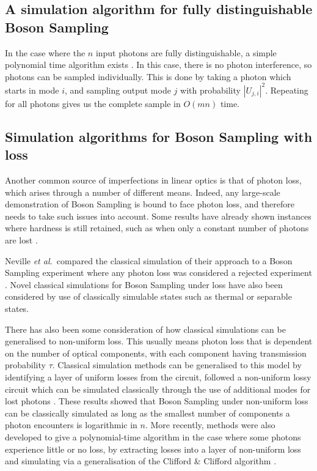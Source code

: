 \subsection{A simulation algorithm for fully distinguishable Boson Sampling}
\label{ssec:fully-dist-sim}

In the case where the $n$ input photons are fully distinguishable, a simple polynomial time algorithm exists \cite{aaronson2014}. In this case, there is no photon interference, so photons can be sampled individually. This is done by taking a photon which starts in mode $i$, and sampling output mode $j$ with probability $|U_{j,i}|^2$. Repeating for all photons gives us the complete sample in $O(mn)$ time.

\subsection{Simulation algorithms for Boson Sampling with loss}

Another common source of imperfections in linear optics is that of photon loss, which arises through a number of different means. 
Indeed, any large-scale demonstration of Boson Sampling is bound to face photon loss, and therefore needs to take such issues into account. 
Some results have already shown instances where hardness is still retained, such as when only a constant number of photons are lost \cite{aaronson2016,wang2018}.

Neville \textit{et al.}\ compared the classical simulation of their approach to a Boson Sampling experiment where any photon loss was considered a rejected experiment \cite{neville2017}. Novel classical simulations for Boson Sampling under loss have also been considered by use of classically simulable states such as thermal \cite{garciapatron2017} or separable \cite{oszmaniec2018} states.

There has also been some consideration of how classical simulations can be generalised to non-uniform loss. 
This usually means photon loss that is dependent on the number of optical components, with each component having transmission probability $\tau$. 
Classical simulation methods can be generalised to this model by identifying a layer of uniform losses from the circuit, followed a non-uniform lossy circuit which can be simulated classically through the use of additional modes for lost photons \cite{garciapatron2017,oszmaniec2018}. 
These results showed that Boson Sampling under non-uniform loss can be classically simulated as long as the smallest number of components a photon encounters is logarithmic in $n$. More recently, methods were also developed to give a polynomial-time algorithm in the case where some photons experience little or no loss, by extracting losses into a layer of non-uniform loss and simulating via a generalisation of the Clifford \& Clifford algorithm \cite{brod2019}.

